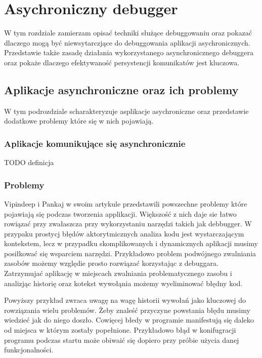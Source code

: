 \chapter{Asychroniczny debugger}

W tym rozdziale zamierzam opisać techniki służące debuggowaniu oraz pokazać dlaczego mogą być niewsytarczjące do debuggowania aplikacji asychronicznych. Przedstawie także zasadę działania wykorzystanego asynchronicznego debuggera oraz pokaże dlaczego efektywaność persystencji komunikatów jest kluczowa.

\section{Aplikacje asynchroniczne oraz ich problemy}

W tym podrozdziale scharakteryzuje asplikacje asychroniczne oraz przedstawie dodatkowe problemy które się w nich pojawiają.

\subsection{Aplikacje komunikujące się asynchronicznie}

TODO definicja

\subsection{Problemy}
Vipindeep i Pankaj w swoim artykule \cite{commonBugs} przedstawili powszechne problemy które pojawiają się podczas tworzenia applikacji. Większość z nich daje sie łatwo rowiązać przy zwałaszcza przy wykorzystaniu narzędzi takich jak debbugger. W przypaku prostycj błędów aktorytmicznych analiza kodu jest wystarczającym kontekstem, lecz w przypadku skomplikowanych i dynamicznych aplikacji musimy posiłkować się wsparciem narzędzi. Przykładowo problem podwójnego zwalniania zasobów możemy względie prosto rozwiązać korzystając z debuggara. Zatrzymujać aplikację w miejscach zwalniania problematycznego zasobu i analizjąc historię oraz kotekst wywołąnia możemy wyeliminować błędny kod.

Powyższy przykład zwraca uwagę na wagę historii wywołań jako kluczowej do rowziązania wielu problemów. Żeby znaleść przyczyne powstania błędu musimy wiedzieć jak do niego doszło. Cowięcej błedy w programie manifestują się daleko od miejsca w którym zostały popełnione. Przykładowo błąd w konifugracji programu podczas startu może obiwaić się dopiero przy próbie użycia danej funkcjonalności.

